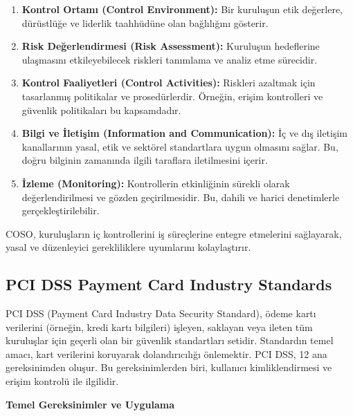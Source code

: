 \begin{enumerate}
    \item \textbf{Kontrol Ortamı (Control Environment):} Bir kuruluşun etik değerlere, dürüstlüğe ve liderlik taahhüdüne olan bağlılığını gösterir.
    \item \textbf{Risk Değerlendirmesi (Risk Assessment):} Kuruluşun hedeflerine ulaşmasını etkileyebilecek riskleri tanımlama ve analiz etme sürecidir.
    \item \textbf{Kontrol Faaliyetleri (Control Activities):} Riskleri azaltmak için tasarlanmış politikalar ve prosedürlerdir. Örneğin, erişim kontrolleri ve güvenlik politikaları bu kapsamdadır.
    \item \textbf{Bilgi ve İletişim (Information and Communication):} İç ve dış iletişim kanallarının yasal, etik ve sektörel standartlara uygun olmasını sağlar. Bu, doğru bilginin zamanında ilgili taraflara iletilmesini içerir.
    \item \textbf{İzleme (Monitoring):} Kontrollerin etkinliğinin sürekli olarak değerlendirilmesi ve gözden geçirilmesidir. Bu, dahili ve harici denetimlerle gerçekleştirilebilir.
\end{enumerate}

COSO, kuruluşların iç kontrollerini iş süreçlerine entegre etmelerini sağlayarak, yasal ve düzenleyici gerekliliklere uyumlarını kolaylaştırır.

\subsection{PCI DSS Payment Card Industry Standards}

PCI DSS (Payment Card Industry Data Security Standard), ödeme kartı verilerini (örneğin, kredi kartı bilgileri) işleyen, saklayan veya ileten tüm kuruluşlar için geçerli olan bir güvenlik standartları setidir. Standardın temel amacı, kart verilerini koruyarak dolandırıcılığı önlemektir. PCI DSS, 12 ana gereksinimden oluşur. Bu gereksinimlerden biri, kullanıcı kimliklendirmesi ve erişim kontrolü ile ilgilidir.

\textbf{Temel Gereksinimler ve Uygulama}

